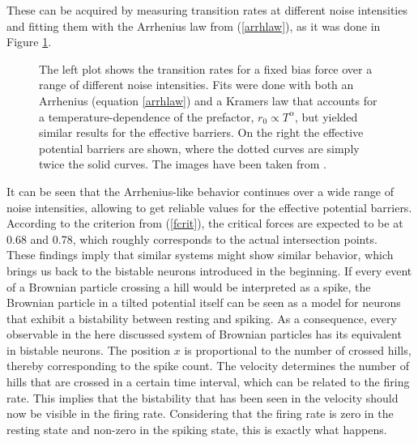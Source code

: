 \documentclass[12pt,a4paper]{article}
\begin{document}
These can be acquired by measuring transition rates at different noise intensities and fitting them with the Arrhenius law from (\ref{arrhlaw}), as it was done in Figure \ref{ratesintro}.
\begin{figure}[H]
	\caption{The left plot shows the transition rates for a fixed bias force over a range of different noise intensities. Fits were done with both an Arrhenius (equation \ref{arrhlaw}) and a Kramers law that accounts for a temperature-dependence of the prefactor, $r_0\propto T^\alpha$, but yielded similar results for the effective barriers. On the right the effective potential barriers are shown, where the dotted curves are simply twice the solid curves.  The images have been taken from \cite{bpp}.}
	\label{ratesintro} 
\end{figure}
It can be seen that the Arrhenius-like behavior continues over a wide range of noise intensities, allowing to get reliable values for the effective potential barriers. According to the criterion from (\ref{fcrit}), the critical forces are expected to be at 0.68 and 0.78, which roughly corresponds to the actual intersection points.\\
These findings imply that similar systems might show similar behavior, which brings us back to the bistable neurons introduced in the beginning. If every event of a Brownian particle crossing a hill would be interpreted as a spike, the Brownian particle in a tilted potential itself can be seen as a model for neurons that exhibit a bistability between resting and spiking. As a consequence, every observable in the here discussed system of Brownian particles has its equivalent in bistable neurons. The position $x$ is proportional to the number of crossed hills, thereby corresponding to the spike count. The velocity determines the number of hills that are crossed in a certain time interval, which can be related to the firing rate. This implies that the bistability that has been seen in the velocity should now be visible in the firing rate. Considering that the firing rate is zero in the resting state and non-zero in the spiking state, this is exactly what happens.
\end{document}
